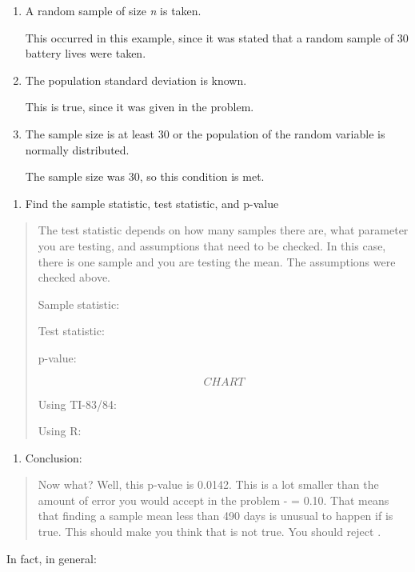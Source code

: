 \documentclass[]{book}
\providecommand{\tightlist}{%
  \setlength{\itemsep}{0pt}\setlength{\parskip}{0pt}}
\begin{document}
\begin{enumerate}
\def\labelenumi{\alph{enumi}.}
\item
  A random sample of size \emph{n} is taken.

  This occurred in this example, since it was stated that a random
  sample of 30 battery lives were taken.
\item
  The population standard deviation is known.

  This is true, since it was given in the problem.
\item
  The sample size is at least 30 or the population of the random
  variable is normally distributed.

  The sample size was 30, so this condition is met.
\end{enumerate}

\begin{enumerate}
\def\labelenumi{\arabic{enumi}.}
\setcounter{enumi}{3}
\tightlist
\item
  Find the sample statistic, test statistic, and p-value
\end{enumerate}

\begin{quote}
The test statistic depends on how many samples there are, what
parameter you are testing, and assumptions that need to be checked. In
this case, there is one sample and you are testing the mean. The
assumptions were checked above.

Sample statistic:

Test statistic:

p-value:

{\[CHART\]}

Using TI-83/84:

Using R:
\end{quote}

\begin{enumerate}
\def\labelenumi{\arabic{enumi}.}
\setcounter{enumi}{4}
\tightlist
\item
  Conclusion:
\end{enumerate}

\begin{quote}
Now what? Well, this p-value is 0.0142. This is a lot smaller than the
amount of error you would accept in the problem - = 0.10. That means
that finding a sample mean less than 490 days is unusual to happen if
is true. This should make you think that is not true. You should
reject .
\end{quote}

In fact, in general:
\end{document}
